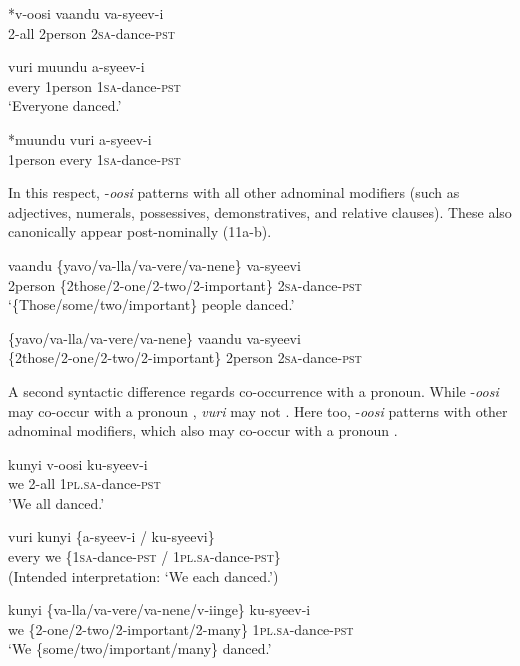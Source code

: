\documentclass[output=paper]{langsci/langscibook}
\begin{document}
\ea
\gll \textup{*}v-oosi    vaandu  va-syeev-i  \\
     2-all    2person  2\textsc{sa}{}-dance-\textsc{pst}  \\
\z

\ea
\gll vuri    muundu  a-syeev-i    \\
     every    1person  1\textsc{sa}{}-dance-\textsc{pst}       \\
\glt ‘Everyone danced.’
\z

\ea
\gll \textup{*}muundu  vuri    a-syeev-i  \\
     1person    every    1\textsc{sa}{}-dance-\textsc{pst}    \\
\z

In this respect, -\textit{oosi} patterns with all other adnominal modifiers (such as adjectives, numerals, possessives, demonstratives, and relative clauses). These also canonically appear post-nominally (11a-b). 

\ea
\gll vaandu  \{yavo/va-lla/va-vere/va-nene\}    va-syeevi  \\
     2person  \{2those/2-one/2-two/2-important\} 2\textsc{sa}{}-dance-\textsc{pst}\\
\glt ‘\{Those/some/two/important\} people danced.’
\z

\ea
\gll *\{yavo/va-lla/va-vere/va-nene\}  vaandu   va-syeevi\\
     \{2those/2-one/2-two/2-important\}  2person  2\textsc{sa}{}-dance-\textsc{pst}\\
\z

  A second syntactic difference regards co-occurrence with a pronoun. While -\textit{oosi} may co-occur with a pronoun , \textit{vuri} may not . Here too, -\textit{oosi} patterns with other adnominal modifiers, which also may co-occur with a pronoun .

\ea
\gll kunyi  v-oosi    ku-syeev-i      \\
     we  2-all    1\textsc{pl}.\textsc{sa}{}-dance-\textsc{pst}\\
\glt 'We all danced.'
\z

\ea
\gll *vuri  kunyi    \{a-syeev-i / ku-syeevi\}  \\
     every  we    \{1\textsc{sa}{}-dance-\textsc{pst /} 1\textsc{pl}.\textsc{sa}{}-dance-\textsc{pst\}}\\
\glt (Intended interpretation: ‘We each danced.’)
\z

\ea
\gll kunyi \{va-lla/va-vere/va-nene/v-iinge\}     ku-syeev-i\\
     we    \{2-one/2-two/2-important/2-many\} 1\textsc{pl}.\textsc{sa}{}-dance-\textsc{pst}\\
\glt ‘We \{some/two/important/many\} danced.’
\z
\end{document}
